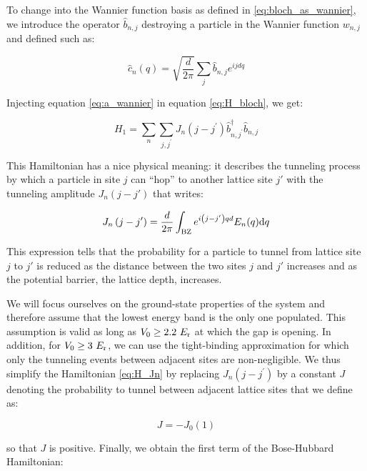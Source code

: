 \noindent To change into the Wannier function basis as defined in \ref{eq:bloch_as_wannier}, we introduce the operator $\hat{b}_{n,j}$ destroying a particle in the Wannier function $w_{n,j}$ and defined such as:

\begin{equation}
    \hat{c}_{n}(q)=\sqrt{\frac{d}{2 \pi}} \sum_{j} \hat{b}_{n, j} e^{i j d q}
    \label{eq:a_wannier}
\end{equation}

\noindent Injecting equation \ref{eq:a_wannier} in equation \ref{eq:H_bloch}, we get:

\begin{equation}
    H_{1}=\sum_{n} \sum_{j, j^{\prime}} J_{n}\left(j-j^{\prime}\right) \hat{b}_{n, j^{\prime}}^{\dagger} \hat{b}_{n,j}
    \label{eq:H_Jn}
\end{equation}

\noindent This Hamiltonian has a nice physical meaning: it describes the tunneling process by which a particle in site $j$ can ``hop'' to another lattice site $j'$ with the tunneling amplitude $J_n (j-j')$ that writes:

\begin{equation}
    J_{n}\left(j-j^{\prime}\right)=\frac{d}{2 \pi} \int_{\rm{BZ}} e^{i\left(j-j^{\prime}\right) q d} E_{n}(q) \mathrm{d} q
\end{equation}

\noindent This expression tells that the probability for a particle to tunnel from lattice site $j$ to $j'$ is reduced as the distance between the two sites $j$ and $j'$ increases and as the potential barrier, \ie the lattice depth, increases.

We will focus ourselves on the ground-state properties of the system and therefore assume that the lowest energy band is the only one populated. This assumption is valid as long as $V_0 \geq 2.2 \ E_{\rm{r}}$ at which the gap is opening. In addition, for $V_0 \geq 3 \ E_{\rm{r}}$, we can use the tight-binding approximation for which only the tunneling events between adjacent sites are non-negligible. We thus simplify the Hamiltonian \ref{eq:H_Jn} by replacing  $J_{n}\left(j-j^{\prime}\right)$ by a constant $J$ denoting the probability to tunnel between adjacent lattice sites that we define as:

\begin{equation}
    J=-J_0(1)
\end{equation}

\noindent so that $J$ is positive. Finally, we obtain the first term of the Bose-Hubbard Hamiltonian:

